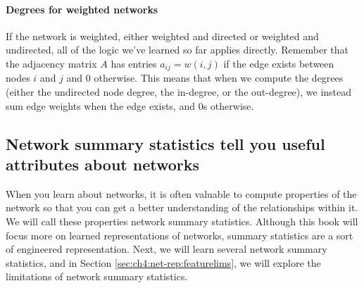 \paragraph{Degrees for weighted networks}

If the network is weighted, either weighted and directed or weighted and undirected, all of the logic we've learned so far applies directly. Remember that the adjacency matrix $A$ has entries $a_{ij} = w(i, j)$ if the edge exists between nodes $i$ and $j$ and $0$ otherwise. This means that when we compute the degrees (either the undirected node degree, the in-degree, or the out-degree), we instead sum edge weights when the edge exists, and $0$s otherwise.

\subsection{Network summary statistics tell you useful attributes about networks}

When you learn about networks, it is often valuable to compute properties of the network so that you can get a better understanding of the relationships within it. We will call these properties {network summary statistics}. Although this book will focus more on {learned} representations of networks, summary statistics are a sort of {engineered} representation. Next, we will learn several network summary statistics, and in Section \ref{sec:ch4:net-rep:featurelims}, we will explore the limitations of network summary statistics.


